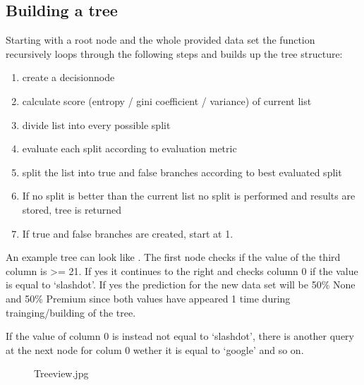 \documentclass[letterpaper,10pt,english]{sphinxmanual}
\begin{document}
\subsection{Building a tree}
\label{\detokenize{DT:building-a-tree}}
Starting with a root node and the whole provided data set the {\hyperref[\detokenize{DT:buildtree}]{}} function recursively
loops through the following steps and builds up the tree structure:
\begin{enumerate}
\item {} 
create a decisionnode

\item {} 
calculate score (entropy / gini coefficient / variance) of current list

\item {} 
divide list into every possible split

\item {} 
evaluate each split according to evaluation metric

\item {} 
split the list into true and false branches according to best evaluated split

\item {} 
If no split is better than the current list no split is performed and results are stored, tree is returned

\item {} 
If true and false branches are created, start at 1.

\end{enumerate}

An example tree can look like {\hyperref[\detokenize{DT:treeview}]{}}.
The first node checks if the value of the third column is \textgreater{}= 21.
If yes it continues to the right and checks column 0 if the value is equal to `slashdot'.
If yes the prediction for the new data set will be 50\% None and 50\% Premium since both values have appeared 1 time during trainging/building of the tree.

If the value of column 0 is instead not equal to `slashdot', there is another query at the next node for colum 0 wether it is equal to `google' and so on.
\begin{figure}[htbp]
\centering
\capstart

\noindent{}
\caption{Treeview.jpg}\label{\detokenize{DT:treeview}}\label{\detokenize{DT:id2}}\end{figure}
\end{document}
